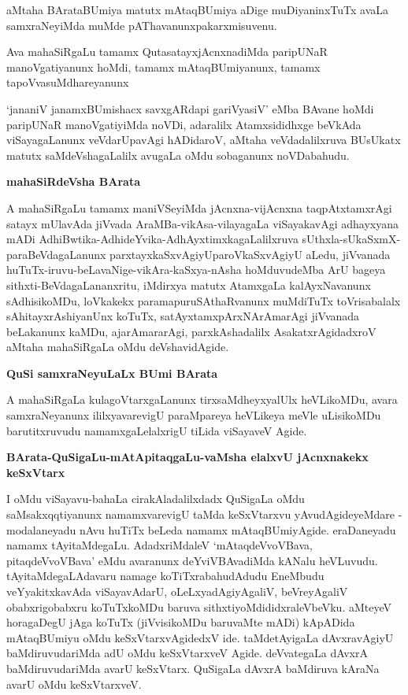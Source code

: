 aMtaha BArataBUmiya matutx mAtaqBUmiya aDige muDiyaninxTuTx avaLa samxraNeyiMda muM\-de pAThavanunxpakarxmisuvenu.

Ava mahaSiRgaLu tamamx QutasatayxjAcnxnadiMda paripUNaR manoVgatiyanunx hoMdi, tamamx mAtaq\-BUmi\-yanunx, tamamx tapoVvasuMdhareyanunx 

`jananiV janamxBUmishacx savxgARdapi gariVyasiV'\label{103} eMba BAvane hoMdi pari\-pUNaR manoVgatiyiMda noVDi, adaralilx Atamxsididhxge beVkAda viSayagaLanunx veVdarUpavAgi hADidaroV, aMtaha veVdadalilxruva BUsUkatx matutx saMdeVsha\-gaLalilx avugaLa oMdu sobaganunx noVDabahudu.

{\bigskip
\noindent
{\large\bf mahaSiRdeVsha BArata}}\label{page103}
\medskip

\noindent
A mahaSiRgaLu tamamx maniVSeyiMda jAcnxna-vijAcnxna taqpAtxtamxrAgi satayx mUlavAda jiVvada AraMBa-\-vikAsa-vilayagaLa viSayakavAgi adhayxyana mADi AdhiBwtika-\-AdhideYvika-AdhAyxtimxkagaLalilxruva sUthxla-sUkaSxmX-paraBeVdagaLanunx parxtayxkaSxvAgiyU\break paroVkaSxvAgiyU aLedu, jiVvanada huTuTx-iruvu-beLava\-Nige-vikAra-kaSxya-\-nAsha hoMduvudeMba ArU bageya sithxti-BeVdagaLananxritu, iMdirxya matutx Atamx\-gaLa kalAyxNavanunx sAdhisikoMDu, loVkakekx paramapuruSAthaRvanunx muMdiTuTx toVrisabalalx sAhitayx\-rAshiyanUnx koTuTx, satAyxtamxpArxNArAmarAgi jiVvanada beLakanunx kaMDu, ajarAmararAgi, parxkAsha\-dalilx AsakatxrAgidadxroV aMtaha mahaSiRgaLa oMdu deVshavidAgide.

\eject

{\bigskip
\noindent
{\large\bf QuSi samxraNeyuLaLx BUmi BArata}}\label{page104}
\medskip

\noindent
A mahaSiRgaLa kulagoVtarxgaLanunx tirxsaMdheyxyalUlx heVLikoMDu, avara samxraNe\break\-yanunx ililxyavare\-vigU paraMpareya heVLikeya meVle uLisikoMDu barutitxru\-vudu namamxgaLelalxrigU tiLida viSayaveV Agide.

{\bigskip
\noindent
{\large\bf BArata-QuSigaLu-mAtApitaqgaLu-vaMsha elalxvU jAcnxnakekx keSxVtarx}}\label{page104}
\medskip

\noindent
I oMdu viSayavu-bahaLa cirakAladalilxdadx QuSigaLa oMdu saMsakxqqtiyanunx namamxvarevigU taMda keSxVtarx\-vu yAvudAgideyeMdare - modalaneyadu nAvu huTiTx beLeda namamx mAtaqBUmiyAgide. eraDa\-neyadu namamx tAyitaMdegaLu. AdadxriMdaleV `mAtaqdeVvoVBava, pitaqdeVvoVBava' eMdu ava\-ranunx deYviVBAvadiMda kANalu heVLuvudu. tAyitaMdegaLAdavaru namage koTiTxrabahudAdudu EneM\-budu veYyakitxkavAda viSayavAdarU, oLeLxyadAgiyAgaliV, beVreyAgaliV obabxrigobabxru koTuTx\-koMDu baruva sithxtiyoMdididxraleVbeVku. aMteyeV horagaDegU jAga koTuTx (jiVvisikoMDu baru\-vaMte mADi) kApADida mAtaqBUmiyu oMdu keSxVtarxvAgidedxV ide. taMdetAyigaLa dAvxravAgiyU baMdiru\-vudariMda adU oMdu keSxVtarxveV Agide. deVvategaLa dAvxrA baMdiruvudariMda avarU keSxVtarx. QuSigaLa dAvxrA baMdiruva kAraNa avarU oMdu keSxVtarxveV.

